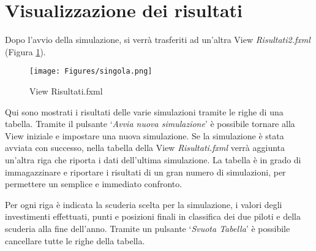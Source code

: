 \section{Visualizzazione dei risultati}
Dopo l’avvio della simulazione, si verrà trasferiti ad un’altra View \textit{Risultati2.fxml} (Figura \ref{fig:risultati_fxml}).

\begin{figure}[h!]
    \centering
    \texttt{[image: Figures/singola.png]}
    \caption{View Risultati.fxml}
    \label{fig:risultati_fxml}
\end{figure}

Qui sono mostrati i risultati delle varie simulazioni tramite le righe di una tabella. Tramite il pulsante ‘\textit{Avvia nuova simulazione}’ è possibile tornare alla View iniziale e impostare una nuova simulazione. Se la simulazione è stata avviata con successo, nella tabella della View \textit{Risultati.fxml} verrà aggiunta un’altra riga che riporta i dati dell’ultima simulazione. La tabella è in grado di immagazzinare e riportare i risultati di un gran numero di simulazioni, per permettere un semplice e immediato confronto.

Per ogni riga è indicata la scuderia scelta per la simulazione, i valori degli investimenti effettuati, punti e posizioni finali in classifica dei due piloti e della scuderia alla fine dell’anno. Tramite un pulsante ‘\textit{Svuota Tabella}’ è possibile cancellare tutte le righe della tabella.


